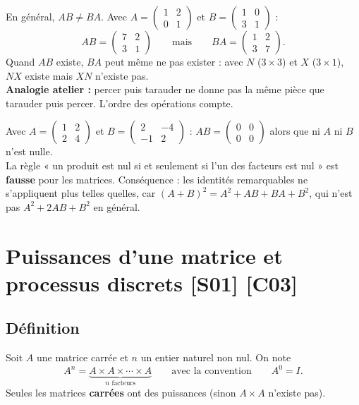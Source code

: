 \documentclass[a4paper,11pt]{article}
\newcommand{\M}[1]{\begin{pmatrix}#1\end{pmatrix}}
\begin{document}
\begin{attention}\label{att:noncommut}
En général, $AB\neq BA$. Avec $A=\M{1 & 2\\ 0 & 1}$ et $B=\M{1 & 0\\ 3 & 1}$ :
\[
AB = \M{7 & 2\\ 3 & 1}
\qquad\text{mais}\qquad
BA = \M{1 & 2\\ 3 & 7}.
\]
Quand $AB$ existe, $BA$ peut même ne pas exister : avec $N$ ($3\times 3$) et $X$ ($3\times 1$), $NX$ existe mais $XN$ n'existe pas.\\
\textbf{Analogie atelier :} percer puis tarauder ne donne pas la même pièce que tarauder puis percer. L'ordre des opérations compte.
\end{attention}

\begin{attention}\label{att:produitnul}
Avec $A=\M{1 & 2\\ 2 & 4}$ et $B=\M{2 & -4\\ -1 & 2}$ : \quad $AB = \M{0 & 0\\ 0 & 0}$ alors que ni $A$ ni $B$ n'est nulle.\\
La règle « un produit est nul si et seulement si l'un des facteurs est nul » est \textbf{fausse} pour les matrices. Conséquence : les identités remarquables ne s'appliquent plus telles quelles, car $(A+B)^2 = A^2 + AB + BA + B^2$, qui n'est pas $A^2+2AB+B^2$ en général.
\end{attention}

\needspace{7cm}
\section{Puissances d'une matrice et processus discrets \hfill {\normalsize\color{uimmred}[S01] [C03]}}\label{sec:puissances}

\subsection{Définition}\label{subsec:defpuissance}

\begin{definition}
Soit $A$ une matrice carrée et $n$ un entier naturel non nul. On note
\[
A^n = \underbrace{A\times A\times\cdots\times A}_{n \text{ facteurs}} \qquad\text{avec la convention}\qquad A^0 = I.
\]
Seules les matrices \textbf{carrées} ont des puissances (sinon $A\times A$ n'existe pas).
\end{definition}
\end{document}
